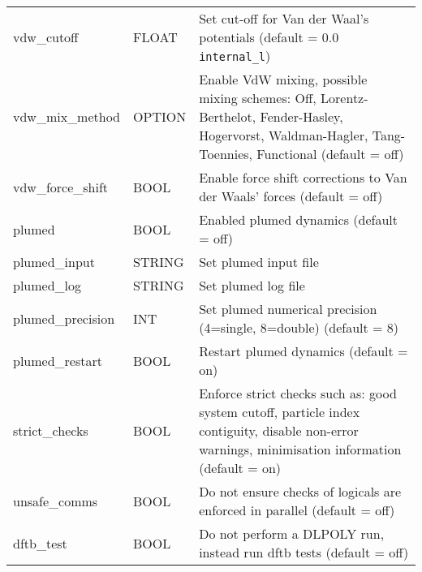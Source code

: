 \begin{longtable}{l l p{10cm}}
vdw\_cutoff & FLOAT & Set cut-off for Van der Waal's potentials (default = 0.0 \verb#internal_l#) \\
vdw\_mix\_method & OPTION & Enable VdW mixing, possible mixing schemes: Off, Lorentz-Berthelot, Fender-Hasley, Hogervorst, Waldman-Hagler, Tang-Toennies, Functional (default = off) \\
vdw\_force\_shift & BOOL & Enable force shift corrections to Van der Waals' forces (default = off) \\
plumed & BOOL & Enabled plumed dynamics (default = off) \\
plumed\_input & STRING & Set plumed input file\\
plumed\_log & STRING & Set plumed log file\\
plumed\_precision & INT & Set plumed numerical precision (4=single, 8=double) (default = 8) \\
plumed\_restart & BOOL & Restart plumed dynamics (default = on) \\
strict\_checks & BOOL & Enforce strict checks such as: good system cutoff, particle index contiguity, disable non-error warnings, minimisation information (default = on) \\
unsafe\_comms & BOOL & Do not ensure checks of logicals are enforced in parallel (default = off) \\
dftb\_test & BOOL & Do not perform a DLPOLY run, instead run dftb tests (default = off) \\
\end{longtable}

